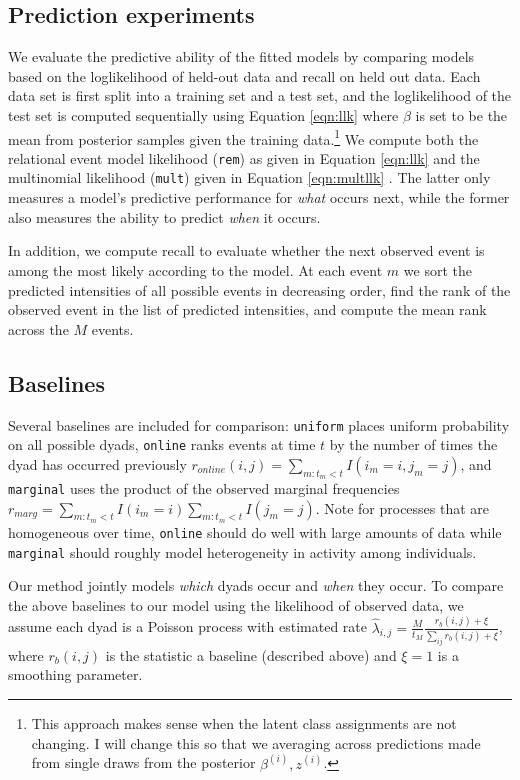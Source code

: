 \documentclass{article}
\begin{document}
\subsection{Prediction experiments}

We evaluate the predictive ability of the fitted models by comparing models based on the loglikelihood of held-out data and recall on held out data.  Each data set is first split into a training set and a test set, and the loglikelihood of the test set is computed sequentially using Equation \ref{eqn:llk} where $\beta$ is set to be the mean from posterior samples given the training data.\footnote{This approach makes sense when the latent class assignments are not changing.  I will change this so that we averaging across predictions made from single draws from the posterior $\beta^{(i)}, z^{(i)}$.}   We compute both the relational event model likelihood  (\texttt{rem}) as given in Equation \ref{eqn:llk}  and the multinomial likelihood (\texttt{mult}) given in Equation \ref{eqn:multllk} .  The latter only measures a model's predictive performance for \emph{what} occurs next, while the former also measures the ability to predict \emph{when} it occurs.  

In addition, we compute recall to evaluate whether the next observed event is among the most likely according to the model.  At each event $m$ we sort the predicted intensities of all possible events in decreasing order, find the rank of the observed event in the list of predicted intensities, and compute the mean rank across the $M$ events.  



\subsection{Baselines}

Several baselines are included for comparison: \texttt{uniform} places uniform probability on all possible dyads, \texttt{online} ranks events at time $t$ by the number of times the dyad has occurred previously $r_{online}(i,j) = \sum_{m:t_m < t} I(i_m=i,j_m=j)$, and \texttt{marginal} uses the product of the observed marginal frequencies $r_{marg} = \sum_{m:t_m < t} I(i_m=i) \sum_{m:t_m < t} I(j_m=j)$.  Note for processes that are homogeneous over time, \texttt{online} should do well with large amounts of data while \texttt{marginal} should roughly model heterogeneity in activity among individuals.  

Our method jointly models \emph{which} dyads occur and \emph{when} they occur.  To compare the above baselines to our model using the likelihood of observed data, we assume each dyad is a Poisson process with estimated  rate $\hat{\lambda}_{i,j} = \frac{M}{t_M} \frac{r_{b}(i,j) + \xi}{\sum_{ij} r_{b}(i,j) + \xi}$, where $r_b(i,j)$ is the statistic a baseline (described above) and $\xi=1$ is a smoothing parameter.
\end{document}
